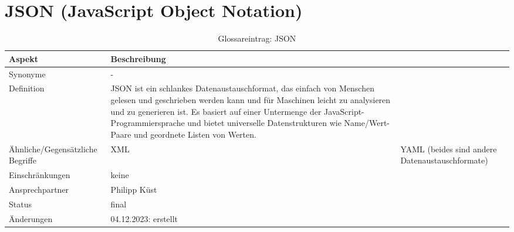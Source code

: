 \section{JSON (JavaScript Object Notation)}\label{sec:glossar_json}
\begin{table}[H]\label{tab:glossar_json}
    \begin{tabularx}{\textwidth}{|l|X|}
        \hline
        \textbf{Aspekt} & \textbf{Beschreibung} \\
        \hline
        Synonyme & - \\
        \hline
        Definition & JSON ist ein schlankes Datenaustauschformat, das einfach von Menschen gelesen und geschrieben werden kann und für Maschinen leicht zu analysieren und zu generieren ist.
        Es basiert auf einer Untermenge der JavaScript-Programmiersprache und bietet universelle Datenstrukturen  wie Name/Wert-Paare und geordnete Listen von Werten. \\
        \hline
        Ähnliche/Gegensätzliche Begriffe & XML & YAML (beides sind andere Datenaustauschformate) \\
        \hline
        Einschränkungen & keine \\
        \hline
        Ansprechpartner & Philipp Küst \\
        \hline
        Status & final \\
        \hline
        Änderungen & 04.12.2023: erstellt \\
        \hline
    \end{tabularx}
    \caption{Glossareintrag: JSON}
\end{table}

